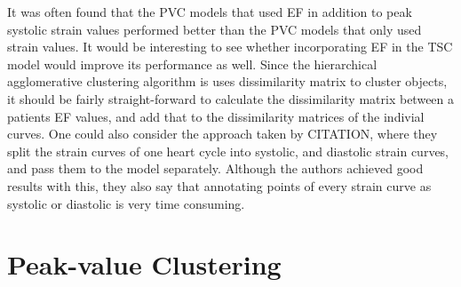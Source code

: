 It was often found that the PVC models that used EF in addition to peak systolic strain values performed better than the PVC models that only used strain values. It would be interesting to see whether incorporating EF in the TSC model would improve its performance as well. Since the hierarchical agglomerative clustering algorithm is uses dissimilarity matrix to cluster objects, it should be fairly straight-forward to calculate the dissimilarity matrix between a patients EF values, and add that to the dissimilarity matrices of the indivial curves. One could also consider the approach taken by CITATION, where they split the strain curves of one heart cycle into systolic, and diastolic strain curves, and pass them to the model separately. Although the authors achieved good results with this, they also say that annotating points of every strain curve as systolic or diastolic is very time consuming.

\section{Peak-value Clustering}

